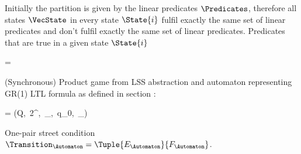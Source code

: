 Initially the partition is given by the linear predicates $\Predicates$, therefore all states $\VecState$ in every state $\State{i}$ fulfil exactly the same set of linear predicates and don't fulfil exactly the same set of linear predicates.
Predicates that are true in a given state $\State{i}$

\startformula
     = 
\stopformula

(Synchronous) Product game from LSS abstraction and automaton representing GR(1) LTL formula as defined in section :

\startformula
    \Automaton = (Q,\, 2^\Predicates,\, \Transition_\Automaton,\, q_0,\, \Condition_\Automaton) \EndPeriod
\stopformula

One-pair street condition $\Transition_\Automaton = \Tuple{E_\Automaton}{F_\Automaton}$.

